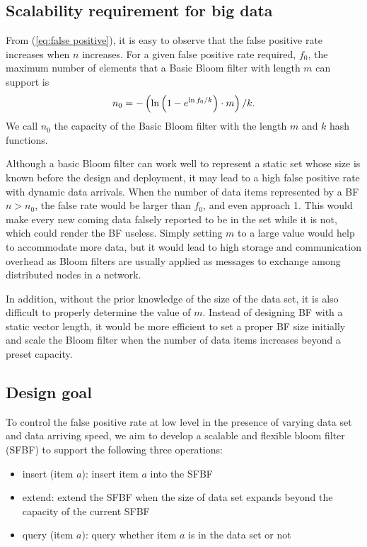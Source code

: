 \documentclass[10pt,journal,compsoc]{IEEEtran}
\begin{document}
\subsection{Scalability requirement for big data}
\label{subsec:Scalable bloom filter design for dynamic MCCS}
From (\ref{eq:false positive}), it is easy to observe that the false positive rate increases when $n$ increases.
For a given false positive rate required, $f_0$, the maximum number of elements that a Basic Bloom filter with length $m$ can support is
\begin{equation}
\footnotesize
{n_0} =  - \left( {\ln \left( {1 - {e^{\ln {f_0}/k}}} \right) \cdot m} \right)/k.
\label{eq:n_0 calculation}
\end{equation}
We call ${n_0}$ the capacity of the Basic Bloom filter with the length $m$ and $k$ hash functions.

Although a basic Bloom filter can work well to represent a static set whose size is known before the design and deployment, it may lead to a high false positive rate with dynamic data arrivals. When the number of data items represented by a BF $n > n_0$, the false rate would be larger than $f_0$, and even approach 1. This would make every new coming data falsely reported to be in the set while it is not, which could render the BF useless. Simply setting $m$ to a large value would help to accommodate more data, but it would lead to high storage and communication overhead  as Bloom filters are usually applied as messages to exchange among distributed nodes in a network.

In addition, without the prior knowledge of the size of the data set, it is also difficult to properly determine the value of $m$.
Instead of designing BF with a static vector length, it would be more efficient to set a proper BF size initially and scale the Bloom filter when the number of data items increases beyond a preset capacity.

\subsection{Design goal}
To control the false positive rate at low level in the presence of varying data set and data arriving speed,  we aim to develop a scalable and flexible bloom filter (SFBF) to support the following three operations:
\begin{itemize}
  \item insert (item $a$): insert item $a$ into the SFBF
  \item extend: extend the SFBF when the size of data set expands beyond the capacity of the current SFBF
  \item query (item $a$): query whether item $a$ is in the data set or not
\end{itemize}
\end{document}
